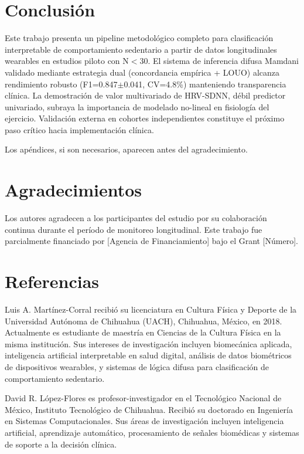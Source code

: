 \documentclass[journal,twoside,web]{ieeecolor}
\begin{document}
\section{Conclusión}
Este trabajo presenta un pipeline metodológico completo para clasificación interpretable de comportamiento sedentario a partir de datos longitudinales wearables en estudios piloto con N$<$30. El sistema de inferencia difusa Mamdani validado mediante estrategia dual (concordancia empírica + LOUO) alcanza rendimiento robusto (F1=0.847$\pm$0.041, CV=4.8\%) manteniendo transparencia clínica. La demostración de valor multivariado de HRV-SDNN, débil predictor univariado, subraya la importancia de modelado no-lineal en fisiología del ejercicio. Validación externa en cohortes independientes constituye el próximo paso crítico hacia implementación clínica.

\appendices

Los apéndices, si son necesarios, aparecen antes del agradecimiento.

\section*{Agradecimientos}

Los autores agradecen a los participantes del estudio por su colaboración continua durante el período de monitoreo longitudinal. Este trabajo fue parcialmente financiado por [Agencia de Financiamiento] bajo el Grant [Número].

\section*{Referencias}




\begin{IEEEbiographynophoto}{Luis A. Martínez-Corral} recibió su licenciatura en Cultura Física y Deporte de la Universidad Autónoma de Chihuahua (UACH), Chihuahua, México, en 2018. Actualmente es estudiante de maestría en Ciencias de la Cultura Física en la misma institución. Sus intereses de investigación incluyen biomecánica aplicada, inteligencia artificial interpretable en salud digital, análisis de datos biométricos de dispositivos wearables, y sistemas de lógica difusa para clasificación de comportamiento sedentario.
\end{IEEEbiographynophoto}

\begin{IEEEbiographynophoto}{David R. López-Flores} es profesor-investigador en el Tecnológico Nacional de México, Instituto Tecnológico de Chihuahua. Recibió su doctorado en Ingeniería en Sistemas Computacionales. Sus áreas de investigación incluyen inteligencia artificial, aprendizaje automático, procesamiento de señales biomédicas y sistemas de soporte a la decisión clínica.
\end{IEEEbiographynophoto}
\end{document}
